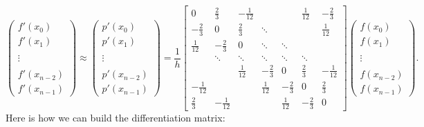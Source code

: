 \documentclass[12pt,a4paper]{article}
\begin{document}
\[
\left(
\begin{array}{c}
f'(x_0) \\
f'(x_1) \\
  \\
\vdots  \\
  \\
f'(x_{n-2}) \\ 
f'(x_{n-1})
\end{array}
\right)
\approx 
\left(
\begin{array}{c}
p'(x_0) \\
p'(x_1) \\
  \\
\vdots  \\
  \\
p'(x_{n-2}) \\
p'(x_{n-1})
\end{array}
\right) = \frac{1}{h}\begin{bmatrix}
 0 & \frac{2}{3} & -\frac{1}{12} &   &  &  \frac{1}{12} & -\frac{2}{3}    \\
-\frac{2}{3} & 0 &  \frac{2}{3} & \ddots   & & & \frac{1}{12}   \\
\frac{1}{12} & -\frac{2}{3} & 0 & \ddots  & \ddots  & &  \\
& \ddots    & \ddots   & \ddots & \ddots &\ddots  & \\
&     & \frac{1}{12} &-\frac{2}{3} & 0 & \frac{2}{3} & -\frac{1}{12} \\
 -\frac{1}{12} &   &  & \frac{1}{12} &-\frac{2}{3} & 0 & \frac{2}{3} \\
 \frac{2}{3}&  -\frac{1}{12} &   &   & \frac{1}{12} &-\frac{2}{3} & 0 
\end{bmatrix}
\left(
\begin{array}{c}
f(x_0) \\
f(x_1) \\
  \\
\vdots  \\
  \\
f(x_{n-2}) \\
f(x_{n-1})
\end{array}
\right).
\]
Here is how we can build the differentiation matrix:
\end{document}
